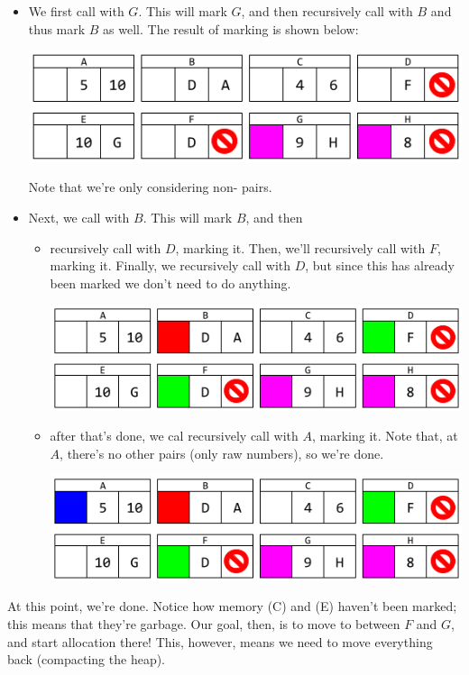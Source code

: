\begin{itemize}
    \item We first call  with $G$. This will mark $G$, and then recursively call  with $B$ and thus mark $B$ as well. The result of marking is shown below: 
    \begin{center}
        \includegraphics[scale=0.6]{assets/GCAlg2_1.png}
    \end{center}
    Note that we're only considering non- pairs.

    \item Next, we call  with $B$. This will mark $B$, and then  
    \begin{itemize}
        \item recursively call  with $D$, marking it. Then, we'll recursively call  with $F$, marking it. Finally, we recursively call  with $D$, but since this has already been marked we don't need to do anything.
        
        \begin{center}
            \includegraphics[scale=0.6]{assets/GCAlg2_2.png}
        \end{center}

        \item after that's done, we cal recursively call  with $A$, marking it. Note that, at $A$, there's no other pairs (only raw numbers), so we're done. 
        
        \begin{center}
            \includegraphics[scale=0.6]{assets/GCAlg2_3.png}
        \end{center}
    \end{itemize}
\end{itemize}
At this point, we're done. Notice how memory (C) and (E) haven't been marked; this means that they're garbage. Our goal, then, is to move  to between $F$ and $G$, and start allocation there! This, however, means we need to move everything back (compacting the heap).


